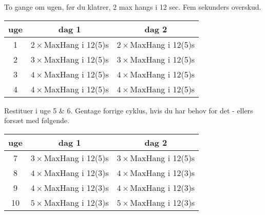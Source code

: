 To gange om ugen, før du klatrer, 2 max hangs
i 12 sec. Fem sekunders overskud.
\vspace{1em}

\begin{table}[h!]
  \centering
  \begin{tabular}{c| c c}
    \textbf{uge} & \textbf{dag 1} & \textbf{dag 2} \\ \hline
    1 & $2\times$MaxHang i 12(5)s & $2\times$MaxHang i 12(5)s \\
    2 & $3\times$MaxHang i 12(5)s & $3\times$MaxHang i 12(5)s \\
    3 & $4\times$MaxHang i 12(5)s & $4\times$MaxHang i 12(5)s \\
    4 & $4\times$MaxHang i 12(5)s & $4\times$MaxHang i 12(5)s \\
  \end{tabular}
\end{table}

  \vspace{1em}
  \raggedright

  Restituer i uge 5 {\&} 6. Gentage forrige cyklus, hvis du har behov for det -
  ellers fors\ae t med f\o lgende.

\begin{table}[h!]
  \centering
  \begin{tabular}{c| c c}
    \textbf{uge} & \textbf{dag 1} & \textbf{dag 2} \\ \hline
    7 & $3\times$MaxHang i 12(5)s & $3\times$MaxHang i 12(5)s \\
    8 & $4\times$MaxHang i 12(3)s & $4\times$MaxHang i 12(3)s \\
    9 & $4\times$MaxHang i 12(3)s & $4\times$MaxHang i 12(3)s \\
    10 & $5\times$MaxHang i 12(3)s & $5\times$MaxHang i 12(3)s \\
  \end{tabular}
\end{table}
